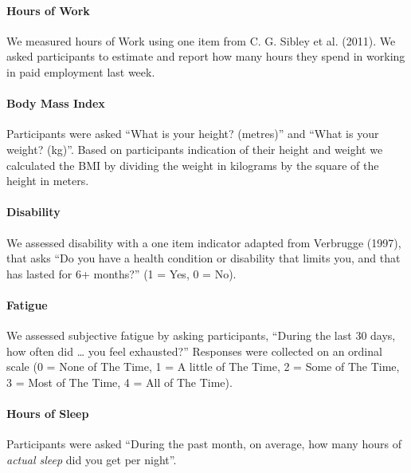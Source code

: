 \documentclass[
  letterpaper,
  DIV=11,
  numbers=noendperiod]{scrartcl}
\let\oldparagraph\paragraph
\renewcommand{\paragraph}[1]{\oldparagraph{#1}\mbox{}}
\begin{document}
\hypertarget{hours-of-work}{%
\paragraph{Hours of Work}\label{hours-of-work}}

We measured hours of Work using one item from C. G. Sibley et al.
(2011). We asked participants to estimate and report how many hours they
spend in working in paid employment last week.

\hypertarget{body-mass-index}{%
\paragraph{Body Mass Index}\label{body-mass-index}}

Participants were asked ``What is your height? (metres)'' and ``What is
your weight? (kg)''. Based on participants indication of their height
and weight we calculated the BMI by dividing the weight in kilograms by
the square of the height in meters.

\hypertarget{disability}{%
\paragraph{Disability}\label{disability}}

We assessed disability with a one item indicator adapted from Verbrugge
(1997), that asks ``Do you have a health condition or disability that
limits you, and that has lasted for 6+ months?'' (1 = Yes, 0 = No).

\hypertarget{fatigue}{%
\paragraph{Fatigue}\label{fatigue}}

We assessed subjective fatigue by asking participants, ``During the last
30 days, how often did \ldots{} you feel exhausted?'' Responses were
collected on an ordinal scale (0 = None of The Time, 1 = A little of The
Time, 2 = Some of The Time, 3 = Most of The Time, 4 = All of The Time).

\hypertarget{hours-of-sleep}{%
\paragraph{Hours of Sleep}\label{hours-of-sleep}}

Participants were asked ``During the past month, on average, how many
hours of \emph{actual sleep} did you get per night''.
\end{document}

